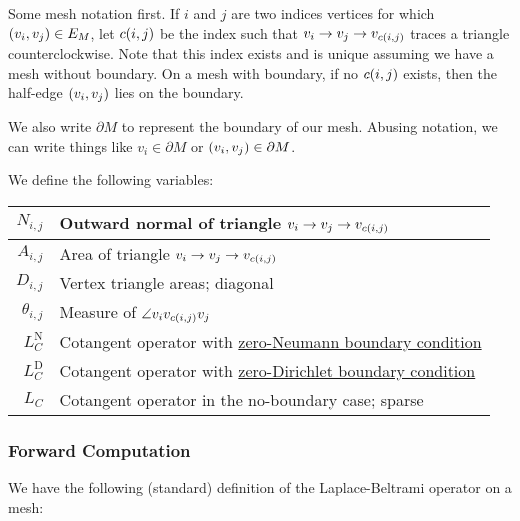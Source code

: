 Some mesh notation first. If \(i\) and \(j\) are two indices vertices for which \(\pof{v_i, v_j} \in E_M\), let \(c\pof{i, j}\) be the index such that \(v_i \to v_j \to v_{c\pof{i, j}}\) traces a triangle counterclockwise. Note that this index exists and is unique assuming we have a mesh without boundary. On a mesh with boundary, if no \(c\pof{i, j}\) exists, then the half-edge \(\pof{v_i, v_j}\) lies on the boundary.

We also write \(\partial M\) to represent the boundary of our mesh. Abusing notation, we can write things like \(v_i \in \partial M\) or \(\pof{v_i, v_j} \in \partial M\).

We define the following variables: \begin{center}\begin{tabular}{r|l}
	\(N_{i, j}\) & Outward normal of triangle \(v_i \to v_j \to v_{c\pof{i, j}}\) \\ \hline
	\(A_{i, j}\) & Area of triangle \(v_i \to v_j \to v_{c\pof{i, j}}\) \\ \hline
	\(D_{i, j}\) & Vertex triangle areas; diagonal \\ \hline
	\(\theta_{i, j}\) & Measure of \(\angle v_iv_{c\pof{i, j}}v_j\) \\ \hline
	\(L_C^{\text{N}}\) & Cotangent operator with \href{https://en.wikipedia.org/wiki/Neumann_boundary_condition}{zero-Neumann boundary condition} \\ \hline
	\(L_C^{\text{D}}\) & Cotangent operator with \href{https://en.wikipedia.org/wiki/Dirichlet_boundary_condition}{zero-Dirichlet boundary condition} \\ \hline
	\(L_C\) & Cotangent operator in the no-boundary case; sparse
\end{tabular}\end{center}

\subsubsection{Forward Computation}

We have the following (standard) definition of the Laplace-Beltrami operator on a mesh:

